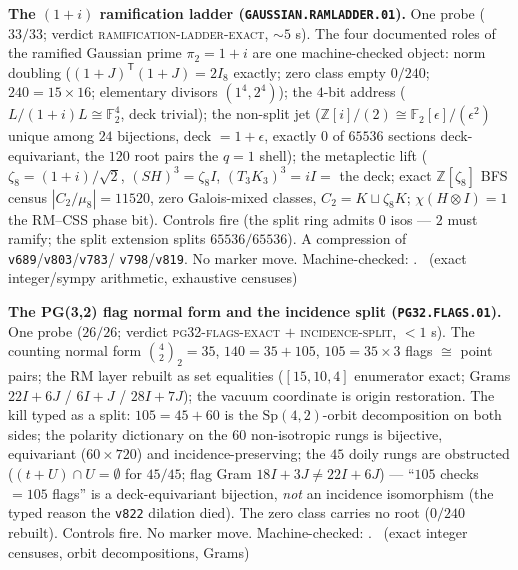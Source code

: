 \documentclass[11pt,a4paper]{article}
\newcommand{\Z}{\mathbb{Z}}
\theoremstyle{definition}
\begin{document}
\par\smallskip\noindent\textbf{The $(1{+}i)$ ramification ladder
(\texttt{GAUSSIAN.RAMLADDER.01}).}
One probe ($33/33$; verdict \textsc{ramification-ladder-exact},
$\sim5$ s).  The four documented roles of the ramified Gaussian
prime $\pi_2 = 1{+}i$ are one machine-checked object: norm
doubling ($(1{+}J)^{\mathsf T}(1{+}J) = 2I_8$ exactly; zero class
empty $0/240$; $240 = 15\times16$; elementary divisors
$(1^4,2^4)$); the $4$-bit address ($L/(1{+}i)L \cong \mathbb
F_2^4$, deck trivial); the non-split jet ($\Z[i]/(2) \cong
\mathbb F_2[\epsilon]/(\epsilon^2)$ unique among $24$ bijections,
deck $= 1{+}\epsilon$, exactly $0$ of $65536$ sections
deck-equivariant, the $120$ root pairs the $q{=}1$ shell); the
metaplectic lift ($\zeta_8 = (1{+}i)/\sqrt2$, $(SH)^3 = \zeta_8I$,
$(T_3K_3)^3 = iI =$ the deck; exact $\Z[\zeta_8]$ BFS census
$|C_2/\mu_8| = 11520$, zero Galois-mixed classes,
$C_2 = K \sqcup \zeta_8K$; $\chi(H{\otimes}I) = 1$ the RM--CSS
phase bit).  Controls fire (the split ring admits $0$ isos ---
$2$ must ramify; the split extension splits $65536/65536$).  A
compression of \texttt{v689}/\texttt{v803}/\texttt{v783}/%
\texttt{v798}/\texttt{v819}.  No marker move.
Machine-checked: .
\mE\ (exact integer/sympy arithmetic, exhaustive censuses)
\par\smallskip

\par\smallskip\noindent\textbf{The PG(3,2) flag normal form and
the incidence split (\texttt{PG32.FLAGS.01}).}
One probe ($26/26$; verdict \textsc{pg32-flags-exact} $+$
\textsc{incidence-split}, $<1$ s).  The counting normal form
$\binom{4}{2}_2 = 35$, $140 = 35 + 105$, $105 = 35\times3$ flags
$\cong$ point pairs; the RM layer rebuilt as set equalities
($[15,10,4]$ enumerator exact; Grams $22I{+}6J$ / $6I{+}J$ /
$28I{+}7J$); the vacuum coordinate is origin restoration.  The
kill typed as a split: $105 = 45 + 60$ is the
$\mathrm{Sp}(4,2)$-orbit decomposition on both sides; the
polarity dictionary on the $60$ non-isotropic rungs is bijective,
equivariant ($60\times720$) and incidence-preserving; the $45$
doily rungs are obstructed ($(t{+}U)\cap U = \emptyset$ for
$45/45$; flag Gram $18I{+}3J \ne 22I{+}6J$) --- ``$105$ checks
$= 105$ flags'' is a deck-equivariant bijection, \emph{not} an
incidence isomorphism (the typed reason the \texttt{v822}
dilation died).  The zero class carries no root ($0/240$
rebuilt).  Controls fire.  No marker move.
Machine-checked: .
\mE\ (exact integer censuses, orbit decompositions, Grams)
\par\smallskip
\end{document}

